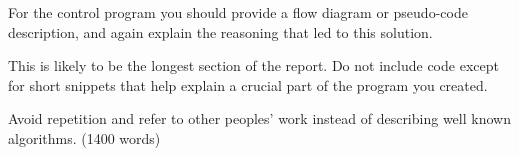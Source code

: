 
For the control program you should provide a flow diagram or pseudo-code description, and again explain the reasoning that led to this solution.

This is likely to be the longest section of the report. Do not include code except for short snippets that help explain a crucial part of the program you created.

Avoid repetition and refer to other peoples' work instead of describing well known algorithms. (1400 words)

\newpage
